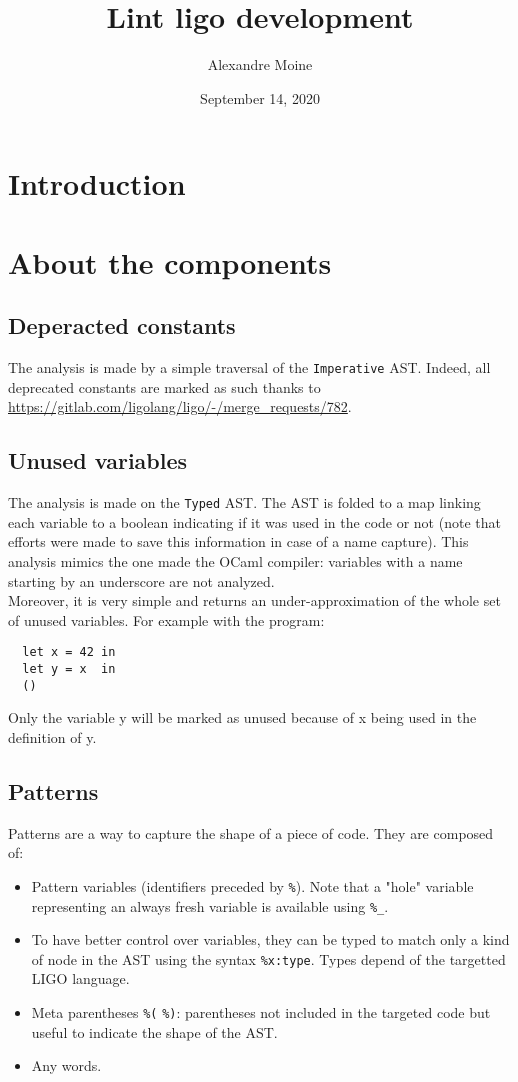 \documentclass[10pt,a4paper]{article}
\author{Alexandre Moine}
\title{Lint ligo development}
\date{September 14, 2020}
\begin{document}
\maketitle

\section{Introduction}



\section{About the components}

\subsection{Deperacted constants}

The analysis is made by a simple traversal of the \verb|Imperative| AST. Indeed, all deprecated constants are marked as such thanks to \url{https://gitlab.com/ligolang/ligo/-/merge_requests/782}.

\subsection{Unused variables}

The analysis is made on the \verb|Typed| AST. The AST is folded to a map linking each variable to a boolean indicating if it was used in the code or not (note that efforts were made to save this information in case of a name capture).
This analysis mimics the one made the OCaml compiler: variables with a name starting by an underscore are not analyzed.\\
Moreover, it is very simple and returns an under-approximation of the whole set of unused variables.
For example with the program:
\begin{verbatim}
  let x = 42 in
  let y = x  in
  ()
\end{verbatim}
Only the variable y will be marked as unused because of x being used in the definition of y.

\subsection{Patterns}
Patterns are a way to capture the shape of a piece of code. They are composed of:

\begin{itemize}
\item Pattern variables (identifiers preceded by \verb|%|). Note that a "hole" variable representing an always fresh variable is available using \verb|%_|.
\item To have better control over variables, they can be typed to match only a kind of node in the AST using the syntax \verb|%x:type|. Types depend of the targetted LIGO language.
\item Meta parentheses \verb|%(| \verb|%)|: parentheses not included in the targeted code but useful to indicate the shape of the AST.
\item Any words.
\end{itemize}
\end{document}
